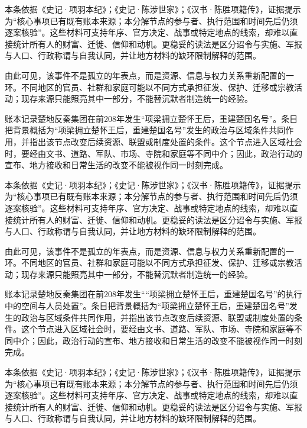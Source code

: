 本条依据《史记·项羽本纪》；《史记·陈涉世家》；《汉书·陈胜项籍传》，证据提示为“核心事项已有既有账本来源；本分解节点的参与者、执行范围和时间先后仍须逐案核验”。这些材料可支持年序、官方决定、战事或特定地点的线索，却难以直接统计所有人的财富、迁徙、信仰和动机。更稳妥的读法是区分诏令与实施、军报与人口、行政称谓与自我认同，并让地方材料的缺环限制解释的范围。

由此可见，该事件不是孤立的年表点，而是资源、信息与权力关系重新配置的一环。不同地区的官员、社群和家庭可能以不同方式承担征发、保护、迁移或宗教活动；现存来源只能照亮其中一部分，不能替沉默者制造统一的经验。

账本记录楚地反秦集团在前208年发生“项梁拥立楚怀王后，重建楚国名号”。条目把背景概括为“项梁拥立楚怀王后，重建楚国名号”发生的政治与区域条件共同作用，并指出该节点改变后续资源、联盟或制度处置的条件。这个节点进入区域社会时，要经由文书、道路、军队、市场、寺院和家庭等不同中介；因此，政治行动的宣布、地方接收和日常生活的改变不能被视作同一时刻完成。

本条依据《史记·项羽本纪》；《史记·陈涉世家》；《汉书·陈胜项籍传》，证据提示为“核心事项已有既有账本来源；本分解节点的参与者、执行范围和时间先后仍须逐案核验”。这些材料可支持年序、官方决定、战事或特定地点的线索，却难以直接统计所有人的财富、迁徙、信仰和动机。更稳妥的读法是区分诏令与实施、军报与人口、行政称谓与自我认同，并让地方材料的缺环限制解释的范围。

由此可见，该事件不是孤立的年表点，而是资源、信息与权力关系重新配置的一环。不同地区的官员、社群和家庭可能以不同方式承担征发、保护、迁移或宗教活动；现存来源只能照亮其中一部分，不能替沉默者制造统一的经验。

账本记录楚地反秦集团在前208年发生““项梁拥立楚怀王后，重建楚国名号”的执行中的空间与人员处置”。条目把背景概括为“项梁拥立楚怀王后，重建楚国名号”发生的政治与区域条件共同作用，并指出该节点改变后续资源、联盟或制度处置的条件。这个节点进入区域社会时，要经由文书、道路、军队、市场、寺院和家庭等不同中介；因此，政治行动的宣布、地方接收和日常生活的改变不能被视作同一时刻完成。

本条依据《史记·项羽本纪》；《史记·陈涉世家》；《汉书·陈胜项籍传》，证据提示为“核心事项已有既有账本来源；本分解节点的参与者、执行范围和时间先后仍须逐案核验”。这些材料可支持年序、官方决定、战事或特定地点的线索，却难以直接统计所有人的财富、迁徙、信仰和动机。更稳妥的读法是区分诏令与实施、军报与人口、行政称谓与自我认同，并让地方材料的缺环限制解释的范围。

